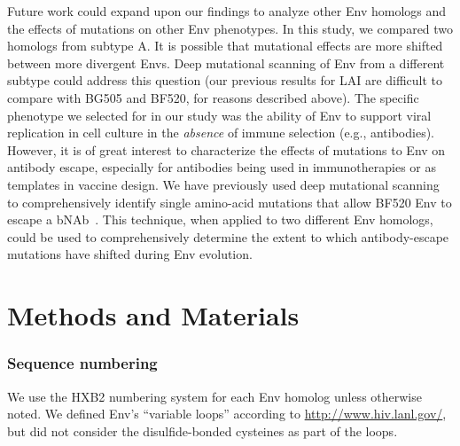 \documentclass[9pt,lineno]{elife}
\begin{document}
Future work could expand upon our findings to analyze other Env homologs and the effects of mutations on other Env phenotypes.
In this study, we compared two homologs from subtype A.
It is possible that mutational effects are more shifted between more divergent Envs.
Deep mutational scanning of Env from a different subtype could address this question (our previous results for LAI are difficult to compare with BG505 and BF520, for reasons described above).
The specific phenotype we selected for in our study was the ability of Env to support viral replication in cell culture in the \textit{absence} of immune selection (e.g., antibodies).
However, it is of great interest to characterize the effects of mutations to Env on antibody escape, especially for antibodies being used in immunotherapies or as templates in vaccine design.
We have previously used deep mutational scanning to comprehensively identify single amino-acid mutations that allow BF520 Env to escape a bNAb~\cite{dingens2017comprehensive}.
This technique, when applied to two different Env homologs, could be used to comprehensively determine the extent to which antibody-escape mutations have shifted during Env evolution.


\section{Methods and Materials}

\subsubsection*{Sequence numbering}
We use the HXB2 numbering system \cite{korber1998numbering} for each Env homolog unless otherwise noted.
We defined Env's ``variable loops'' according to \url{http://www.hiv.lanl.gov/}, but did not consider the disulfide-bonded cysteines as part of the loops.
\end{document}
